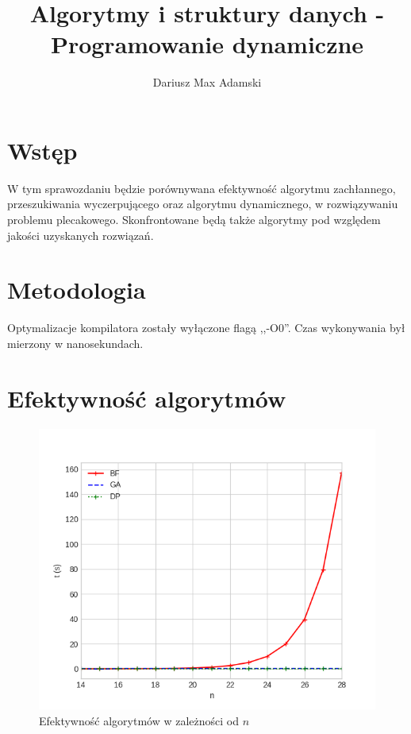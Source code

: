 \documentclass[11pt,twocolumn]{article}
\title{Algorytmy i struktury danych - Programowanie dynamiczne}
\author{Dariusz Max Adamski}
\date{}
\begin{document}
\maketitle


\section*{Wstęp}

W tym sprawozdaniu będzie porównywana efektywność algorytmu zachłannego,
przeszukiwania wyczerpującego oraz algorytmu dynamicznego,
w rozwiązywaniu problemu plecakowego.
Skonfrontowane będą także algorytmy pod względem jakości uzyskanych rozwiązań.


\section*{Metodologia}

Optymalizacje kompilatora zostały wyłączone flagą ,,-O0''. 
Czas wykonywania był mierzony w nanosekundach.


\section{Efektywność algorytmów}

\begin{figure}[h!]
	\includegraphics[width=\linewidth]{speed-n.png}
	\caption{Efektywność algorytmów w zależności od $n$ \label{speed_n}}
\end{figure}
\end{document}
